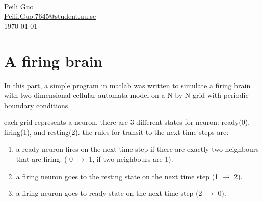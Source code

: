 \documentclass[12pt]{article}
\begin{document}
\begin{titlepage}
\HRule \\[0.4cm]

 

{\huge Peili Guo\\} %
{\large \href{mailto:Peili.Guo.7645@student.uu.se}{Peili.Guo.7645@student.uu.se}}
\\[2cm] %


{\Large \today}\\[2cm] %



\vfill %

\end{titlepage}

\newpage

\section{A firing brain}
\doublespacing
In this part, a simple program in matlab was written to simulate a firing brain with two-dimensional cellular automata model on a N by N grid with periodic boundary conditions.\par

each grid represents a neuron. there are 3 different states for neuron: ready(0), firing(1), and resting(2). 
the rules for transit to the next time steps are:

\begin{enumerate}
\item a ready neuron fires on the next time step if there are exactly two neighbours that are firing. ( 0 $\rightarrow$ 1, if two neighbours are 1).
\item a firing neuron goes to the resting state on the next time step (1 $\rightarrow$ 2).
\item a firing neuron goes to ready state on the next time step (2 $\rightarrow$ 0).
\end{enumerate}
\end{document}

